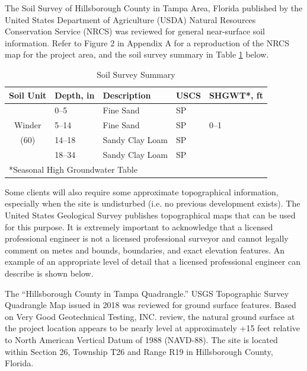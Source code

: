 \documentclass[12pt]{article}
\begin{document}
\begin{letter}
The Soil Survey of Hillsborough County in Tampa Area, Florida published by the United States Department of Agriculture (USDA) Natural Resources Conservation Service (NRCS) was reviewed for general near-surface soil information. Refer to Figure 2 in Appendix A for a reproduction of the NRCS map for the project area, and the soil survey summary in Table \ref{tab:example_SSS} below.

\begin{table}[H]
    \centering
     \caption{Soil Survey Summary}
    \label{tab:example_SSS}
    \begin{tabular}{cllll}
\hline
Soil Unit & Depth, in & Description & USCS & SHGWT*, ft \\ \hline
 & 0--5 & Fine Sand & SP &  \\
Winder & 5--14 & Fine Sand & SP &   0--1\\
(60) & 14--18 & Sandy Clay Loam & SP &   \\
 & 18--34 & Sandy Clay Loam & SP &   \\ \hline
 \multicolumn{5}{l}{*Seasonal High Groundwater Table}
\end{tabular}
   
\end{table}
\end{letter}

Some clients will also require some approximate topographical information, especially when the site is undisturbed (i.e. no previous development exists). The United States Geological Survey publishes topographical maps that can be used for this purpose. It is extremely important to acknowledge that a licensed professional engineer is not a licensed professional surveyor and cannot legally comment on metes and bounds, boundaries, and exact elevation features. An example of an appropriate level of detail that a licensed professional engineer can describe is shown below.

\begin{letter}
The “Hillsborough County in Tampa Quadrangle.” USGS Topographic Survey Quadrangle Map issued in 2018 was reviewed for ground surface features.  Based on Very Good Geotechnical Testing, INC. review, the natural ground surface at the project location appears to be nearly level at approximately +15 feet relative to North American Vertical Datum of 1988 (NAVD-88). The site is located within Section 26, Township T26 and Range R19 in Hillsborough County, Florida. 
\end{letter}
\end{document}
